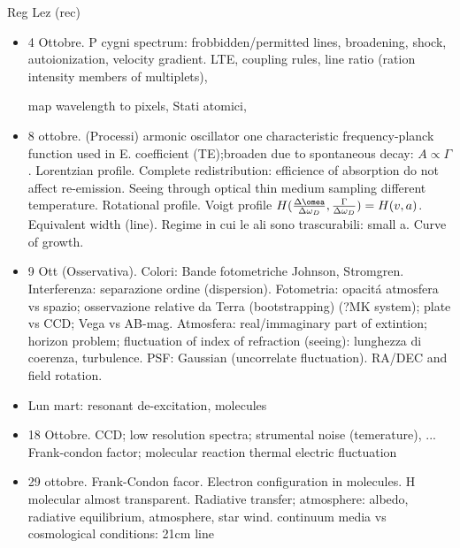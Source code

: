 \begin{frame}[allowframebreaks]{Reg Lez (rec)}

\begin{itemize}
\item 4 Ottobre. P cygni spectrum: frobbidden/permitted lines, broadening, shock, autoionization, velocity gradient.
LTE, coupling rules, line ratio (ration intensity members of multiplets),

 map wavelength to pixels, Stati atomici,
\item 8 ottobre. (Processi) armonic oscillator one characteristic frequency-planck function used in E. coefficient  (TE);broaden due to spontaneous decay: $A\propto\Gamma$. Lorentzian profile. Complete redistribution: efficience of absorption do not affect re-emission.
Seeing through optical thin medium sampling different temperature. Rotational profile. Voigt profile $H(\frac{\Delta\omea}{\Delta\omega_D},\frac{\Gamma}{\Delta\omega_D})=H(v,a)$. Equivalent width (line). Regime in cui le ali sono trascurabili: small a. Curve of growth.
\item 9 Ott (Osservativa). Colori: Bande fotometriche Johnson, Str\:omgren. Interferenza: separazione ordine (dispersion). Fotometria: opacit\'a atmosfera vs spazio; osservazione relative da Terra (bootstrapping) (?MK system); plate vs CCD; Vega vs AB-mag. Atmosfera: real/immaginary part of extintion; horizon problem; fluctuation of index of refraction (seeing): lunghezza di coerenza, turbulence. PSF: Gaussian (uncorrelate fluctuation). RA/DEC and field rotation.

\item Lun mart: resonant de-excitation, molecules

\item 18 Ottobre. CCD; low resolution spectra; strumental noise (temerature), ...
Frank-condon factor; molecular reaction
thermal electric fluctuation
\item 29 ottobre. Frank-Condon facor. Electron configuration in molecules. H molecular almost transparent. Radiative transfer; atmosphere: albedo, radiative equilibrium, atmosphere, star wind.
continuum media vs cosmological conditions: 21cm line
\end{itemize}

\end{frame}